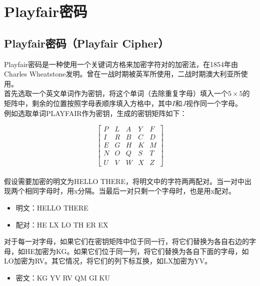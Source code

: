 \newpage

\section{Playfair密码}

\subsection{Playfair密码（Playfair Cipher）}

Playfair密码是一种使用一个关键词方格来加密字符对的加密法，在1854年由Charles Wheatstone发明。曾在一战时期被英军所使用，二战时期澳大利亚所使用。\\

首先选取一个英文单词作为密钥，将这个单词（去除重复字母）填入一个$ 5 \times 5 $的矩阵中，剩余的位置按照字母表顺序填入方格中，其中$ I $和$ J $视作同一个字母。\\

例如选取单词PLAYFAIR作为密钥，生成的密钥矩阵如下：

\[
    \begin{bmatrix}
        P & L & A & Y & F \\
        I & R & B & C & D \\
        E & G & H & K & M \\
        N & O & Q & S & T \\
        U & V & W & X & Z
    \end{bmatrix}
\]\\

假设需要加密的明文为HELLO THERE，将明文中的字符两两配对。当一对中出现两个相同字母时，用x分隔。当最后一对只剩一个字母时，也是用x配对。

\begin{itemize}
    \item 明文：HELLO THERE
    \item 配对：HE LX LO TH ER EX
\end{itemize}

对于每一对字母，如果它们在密钥矩阵中位于同一行，将它们替换为各自右边的字母，如HE加密为KG。如果它们位于同一列，将它们替换为各自下面的字母，如LO加密为RV。其它情况，将它们的列下标互换，如LX加密为YV。

\begin{itemize}
    \item 密文：KG YV RV QM GI KU
\end{itemize}

\vspace{0.5cm}

